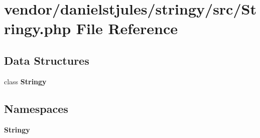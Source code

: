 \section{vendor/danielstjules/stringy/src/\+Stringy.php File Reference}
\label{_stringy_8php}
\subsection*{Data Structures}
\begin{DoxyCompactItemize}
\item 
class {\bf Stringy}
\end{DoxyCompactItemize}
\subsection*{Namespaces}
\begin{DoxyCompactItemize}
\item 
 {\bf Stringy}
\end{DoxyCompactItemize}
